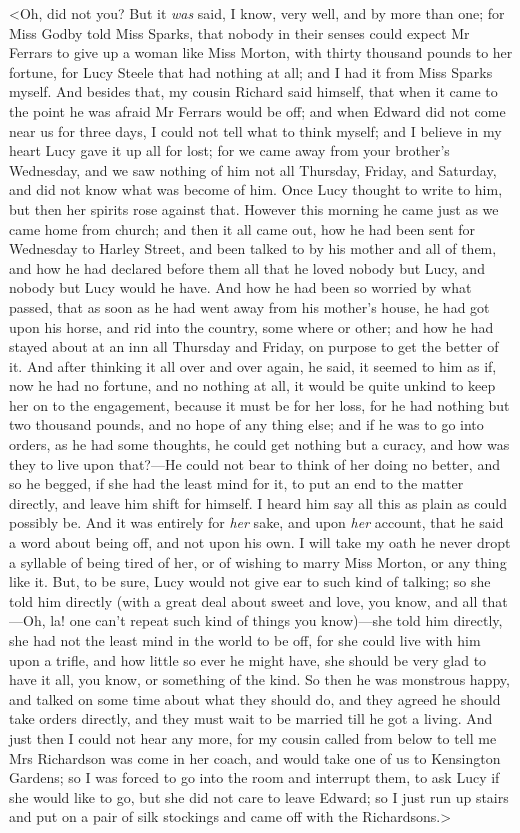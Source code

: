 <Oh, did not you? But it \textit{was} said, I know, very well, and by more than one; for Miss Godby told Miss Sparks, that nobody in their senses could expect Mr Ferrars to give up a woman like Miss Morton, with thirty thousand pounds to her fortune, for Lucy Steele that had nothing at all; and I had it from Miss Sparks myself. And besides that, my cousin Richard said himself, that when it came to the point he was afraid Mr Ferrars would be off; and when Edward did not come near us for three days, I could not tell what to think myself; and I believe in my heart Lucy gave it up all for lost; for we came away from your brother's Wednesday, and we saw nothing of him not all Thursday, Friday, and Saturday, and did not know what was become of him. Once Lucy thought to write to him, but then her spirits rose against that. However this morning he came just as we came home from church; and then it all came out, how he had been sent for Wednesday to Harley Street, and been talked to by his mother and all of them, and how he had declared before them all that he loved nobody but Lucy, and nobody but Lucy would he have. And how he had been so worried by what passed, that as soon as he had went away from his mother's house, he had got upon his horse, and rid into the country, some where or other; and how he had stayed about at an inn all Thursday and Friday, on purpose to get the better of it. And after thinking it all over and over again, he said, it seemed to him as if, now he had no fortune, and no nothing at all, it would be quite unkind to keep her on to the engagement, because it must be for her loss, for he had nothing but two thousand pounds, and no hope of any thing else; and if he was to go into orders, as he had some thoughts, he could get nothing but a curacy, and how was they to live upon that?—He could not bear to think of her doing no better, and so he begged, if she had the least mind for it, to put an end to the matter directly, and leave him shift for himself. I heard him say all this as plain as could possibly be. And it was entirely for \textit{her} sake, and upon \textit{her} account, that he said a word about being off, and not upon his own. I will take my oath he never dropt a syllable of being tired of her, or of wishing to marry Miss Morton, or any thing like it. But, to be sure, Lucy would not give ear to such kind of talking; so she told him directly (with a great deal about sweet and love, you know, and all that—Oh, la! one can't repeat such kind of things you know)—she told him directly, she had not the least mind in the world to be off, for she could live with him upon a trifle, and how little so ever he might have, she should be very glad to have it all, you know, or something of the kind. So then he was monstrous happy, and talked on some time about what they should do, and they agreed he should take orders directly, and they must wait to be married till he got a living. And just then I could not hear any more, for my cousin called from below to tell me Mrs Richardson was come in her coach, and would take one of us to Kensington Gardens; so I was forced to go into the room and interrupt them, to ask Lucy if she would like to go, but she did not care to leave Edward; so I just run up stairs and put on a pair of silk stockings and came off with the Richardsons.>

